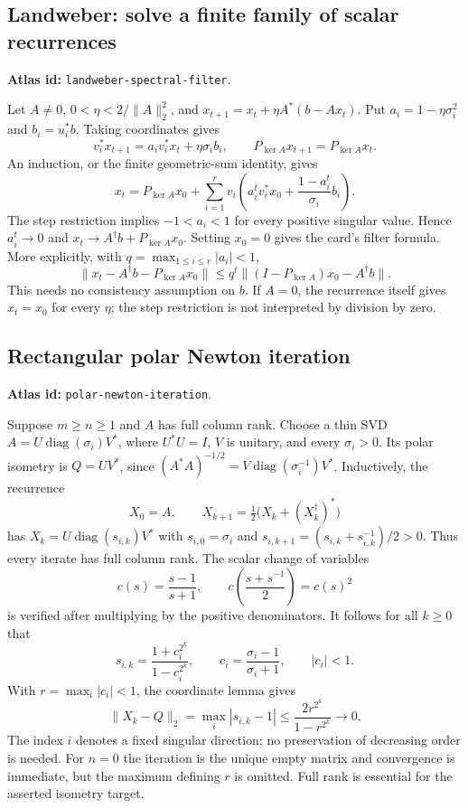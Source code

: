 \documentclass[11pt,a4paper]{article}
\DeclareMathOperator{\diag}{diag}
\DeclareRobustCommand{\code}[1]{{\footnotesize\urlstyle{tt}\nolinkurl{#1}}}
\begin{document}
\subsection{Landweber: solve a finite family of scalar recurrences}
\label{sec:eq-landweber}
\textbf{Atlas id:} \code{landweber-spectral-filter}.

Let $A\ne0$, $0<\eta<2/\|A\|_2^2$, and
$x_{t+1}=x_t+\eta A^*(b-Ax_t)$. Put
$a_i=1-\eta\sigma_i^2$ and $b_i=u_i^*b$. Taking coordinates gives
\[
 v_i^*x_{t+1}=a_i v_i^*x_t+\eta\sigma_i b_i,
 \qquad P_{\ker A}x_{t+1}=P_{\ker A}x_t.
\]
An induction, or the finite geometric-sum identity, gives
\begin{equation}\label{eq:eq-landweber}
 x_t=P_{\ker A}x_0+
 \sum_{i=1}^r v_i\left(
 a_i^t v_i^*x_0+\frac{1-a_i^t}{\sigma_i}b_i\right).
\end{equation}
The step restriction implies $-1<a_i<1$ for every positive singular
value. Hence $a_i^t\to0$ and
$x_t\to A^\dagger b+P_{\ker A}x_0$. Setting $x_0=0$ gives the card's
filter formula. More explicitly, with
$q=\max_{1\le i\le r}|a_i|<1$,
\[
 \|x_t-A^\dagger b-P_{\ker A}x_0\|
 \le q^t\|(I-P_{\ker A})x_0-A^\dagger b\|.
\]
This needs no consistency assumption on $b$. If $A=0$, the recurrence
itself gives $x_t=x_0$ for every $\eta$; the step restriction is not
interpreted by division by zero.

\subsection{Rectangular polar Newton iteration}
\label{sec:eq-polar-newton}
\textbf{Atlas id:} \code{polar-newton-iteration}.

Suppose $m\ge n\ge1$ and $A$ has full column rank. Choose a thin SVD
$A=U\diag(\sigma_i)V^*$, where $U^*U=I$, $V$ is unitary, and every
$\sigma_i>0$. Its polar isometry is $Q=UV^*$, since
$(A^*A)^{-1/2}=V\diag(\sigma_i^{-1})V^*$.
Inductively, the recurrence
\[
 X_0=A,\qquad X_{k+1}=\tfrac12\bigl(X_k+(X_k^\dagger)^*\bigr)
\]
has $X_k=U\diag(s_{i,k})V^*$ with
$s_{i,0}=\sigma_i$ and
$s_{i,k+1}=(s_{i,k}+s_{i,k}^{-1})/2>0$. Thus every iterate has full
column rank. The scalar change of variables
\[
 c(s)=\frac{s-1}{s+1},\qquad
 c\left(\frac{s+s^{-1}}2\right)=c(s)^2
\]
is verified after multiplying by the positive denominators. It follows
for all $k\ge0$ that
\[
 s_{i,k}=\frac{1+c_i^{2^k}}{1-c_i^{2^k}},\qquad
 c_i=\frac{\sigma_i-1}{\sigma_i+1},\qquad |c_i|<1.
\]
With $r=\max_i|c_i|<1$, the coordinate lemma gives
\[
 \|X_k-Q\|_2=\max_i|s_{i,k}-1|
 \le\frac{2r^{2^k}}{1-r^{2^k}}\longrightarrow0.
\]
The index $i$ denotes a fixed singular direction; no preservation of
decreasing order is needed. For $n=0$ the iteration is the unique empty
matrix and convergence is immediate, but the maximum defining $r$ is
omitted. Full rank is essential for the asserted isometry target.
\end{document}
